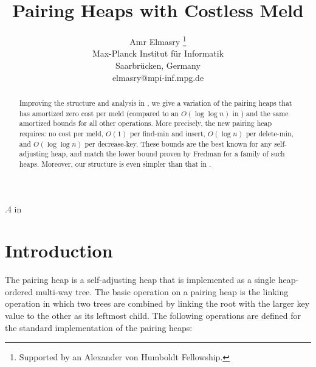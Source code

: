 
\oddsidemargin .4 in       
\setlength{\textheight}{8in}
\setlength{\textwidth}{5.4in}


\newcommand{\hide}[1]{}
\newcommand{\sequence}[1]{\left\langle#1\right\rangle}

\newtheorem{theorem}{Theorem}
\newtheorem{lemma}{Lemma}
\newtheorem{prop}{Proposition}



\title{\Large Pairing Heaps with Costless Meld}

\author{Amr Elmasry \thanks{Supported by an Alexander von Humboldt Fellowship.}\\
Max-Planck Institut f\"{u}r Informatik \\
Saarbr\"{u}cken, Germany \\
\small elmasry@mpi-inf.mpg.de}
\date{}

\maketitle

\begin{abstract} \small\baselineskip=9pt
Improving the structure and analysis in \cite{elm0}, we give a variation of the pairing heaps that has amortized zero cost per meld (compared to an $O(\log \log{n})$ in \cite{elm0}) and the same amortized bounds for all other operations. 
More precisely, the new pairing heap requires: no cost per meld, $O(1)$ per find-min and insert, $O(\log{n})$ per delete-min, and $O(\log\log{n})$ per decrease-key. These bounds are the best known for any self-adjusting heap, and match the lower bound proven by Fredman for a family of such heaps. Moreover, our structure is even simpler than that in \cite{elm0}.
 
\end{abstract}


\section{Introduction}

The pairing heap \cite{fsst} is a self-adjusting heap that is implemented as a single heap-ordered multi-way tree. The basic operation on a pairing heap is the linking
operation in which two trees are combined by linking the root with
the larger key value to the other as its leftmost child. 
The following operations are defined for the standard implementation of the pairing heaps:

